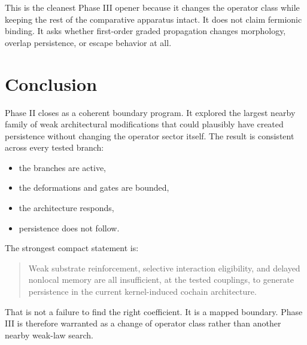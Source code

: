 \documentclass[11pt]{article}
\begin{document}
This is the cleanest Phase III opener because it changes the operator class while keeping the rest of the comparative apparatus intact. It does not claim fermionic binding. It asks whether first-order graded propagation changes morphology, overlap persistence, or escape behavior at all.

\section{Conclusion}

Phase II closes as a coherent boundary program. It explored the largest nearby family of weak architectural modifications that could plausibly have created persistence without changing the operator sector itself. The result is consistent across every tested branch:
\begin{itemize}
\item the branches are active,
\item the deformations and gates are bounded,
\item the architecture responds,
\item persistence does not follow.
\end{itemize}

The strongest compact statement is:

\begin{quote}
Weak substrate reinforcement, selective interaction eligibility, and delayed nonlocal memory are all insufficient, at the tested couplings, to generate persistence in the current kernel-induced cochain architecture.
\end{quote}

That is not a failure to find the right coefficient. It is a mapped boundary. Phase III is therefore warranted as a change of operator class rather than another nearby weak-law search.
\end{document}
